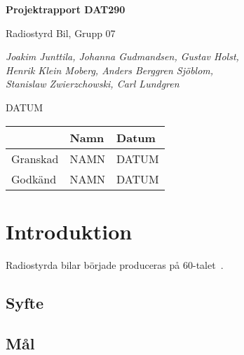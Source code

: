 \documentclass[a4paper]{article}
\begin{document}
\begin{titlepage}
\centering
{\bfseries\huge Projektrapport DAT290}

\vspace{10mm}

{\Large Radiostyrd Bil, Grupp 07}

\vspace{20mm}

{\Large \itshape{Joakim Junttila, Johanna Gudmandsen, Gustav Holst,\\Henrik Klein Moberg, Anders Berggren Sjöblom, \\[1mm] Stanislaw Zwierzchowski, Carl Lundgren}}

\vspace{10mm}

{DATUM}


\normalsize{
\begin{table}[b]
\centering
\begin{tabular}{|l|l|l|}  \hline
          & \bf Namn & \bf Datum   \\ \hline \hline
 Granskad & NAMN     & DATUM        \\ \hline
 Godkänd  & NAMN     & DATUM         \\ \hline
  \end{tabular}  
  \end{table}}
\end{titlepage}

\tableofcontents


\newpage
\section{Introduktion}




Radiostyrda bilar började produceras på 60-talet~\cite{RCHistory}.

\subsection{Syfte}


\subsection{Mål}
\end{document}
